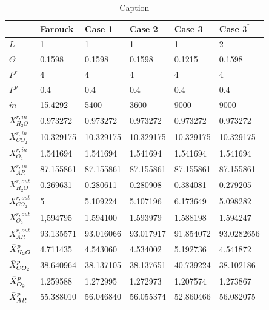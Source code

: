 \begin{table}[H]
\centering
    \caption{Caption}
    \label{tab:table1} 
\begin{tabular}{|l|l|l|l|l|l|}
\hline
                    & Farouck   & Case 1    & Case 2    & Case 3    & Case $3^*$\\\hline
$L$                 & 1         & 1         & 1         & 1         & 2         \\ \hline
$\Theta$            & 0.1598    & 0.1598    & 0.1598    & 0.1215    & 0.1598    \\ \hline
$P^r $              & 4         & 4         & 4         & 4         & 4         \\ \hline
$P^p $              & 0.4       & 0.4       & 0.4       & 0.4       & 0.4       \\ \hline
$\dot{m}$           & 15.4292   & 5400      & 3600      & 9000      & 9000      \\ \hline
$X^{r,in}_{H_2O}$   & 0.973272  & 0.973272  & 0.973272  & 0.973272  & 0.973272  \\ \hline
$X^{r,in}_{CO_2}$   & 10.329175 & 10.329175 & 10.329175 & 10.329175 & 10.329175 \\ \hline 
$X^{r,in}_{O_2}$    & 1.541694  & 1.541694  & 1.541694  & 1.541694  & 1.541694  \\ \hline
$X^{r,in}_{AR}$     & 87.155861 & 87.155861 & 87.155861 & 87.155861 & 87.155861 \\ \hline \hline
$X^{r,out}_{H_2O}$  & 0.269631  & 0.280611  &  0.280908 & 0.384081  & 0.279205  \\ \hline
$X^{r,out}_{CO_2}$  & 5         & 5.109224  & 5.107196  & 6.173649  & 5.098282  \\ \hline
$X^{r,out}_{O_2}$   & 1,594795  & 1.594100  & 1.593979  & 1.588198  & 1.594247  \\ \hline
$X^{r,out}_{AR}$    & 93.135571 & 93.016066 & 93.017917 & 91.854072 & 93.0282656\\ \hline \hline
$\Bar{X}^p_{H_2O}$  & 4.711435  & 4.543060  & 4.534002  & 5.192736  & 4.541872  \\ \hline
$\Bar{X}^p_{CO_2}$  & 38.640964 & 38.137105 & 38.137651 & 40.739224 & 38.102186 \\ \hline
$\Bar{X}^p_{O_2}$   & 1.259588  & 1.272995  & 1.272973  & 1.207574  & 1.273867  \\ \hline
$\Bar{X}^p_{AR}$    & 55.388010 & 56.046840 & 56.055374 & 52.860466 & 56.082075 \\ \hline
\end{tabular}
\end{table}

